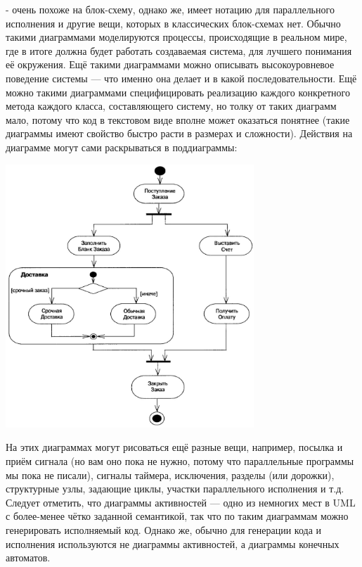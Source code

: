 \documentclass[a5paper]{article}
\begin{document}
 - очень похоже на блок-схему, однако же, имеет нотацию для параллельного исполнения и другие вещи, которых в классических блок-схемах нет. Обычно такими диаграммами моделируются процессы, происходящие в реальном мире, где в итоге должна будет работать создаваемая система, для лучшего понимания её окружения. Ещё такими диаграммами можно описывать высокоуровневое поведение системы --- что именно она делает и в какой последовательности. Ещё можно такими диаграммами специфицировать реализацию каждого конкретного метода каждого класса, составляющего систему, но толку от таких диаграмм мало, потому что код в текстовом виде вполне может оказаться понятнее (такие диаграммы имеют свойство быстро расти в размерах и сложности). Действия на диаграмме могут сами раскрываться в поддиаграммы:

\begin{center}
    \includegraphics[width=0.7\textwidth]{activitySubdiagrams.png}
\end{center}

На этих диаграммах могут рисоваться ещё разные вещи, например, посылка и приём сигнала (но вам оно пока не нужно, потому что параллельные программы мы пока не писали), сигналы таймера, исключения, разделы (или дорожки), структурные узлы, задающие циклы, участки параллельного исполнения и т.д. Следует отметить, что диаграммы активностей --- одно из немногих мест в UML с более-менее чётко заданной семантикой, так что по таким диаграммам можно генерировать исполняемый код. Однако же, обычно для генерации кода и исполнения используются не диаграммы активностей, а диаграммы конечных автоматов.
\end{document}
